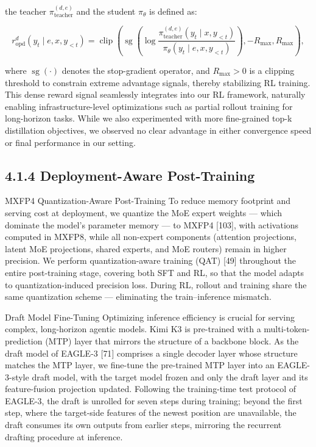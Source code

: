 \documentclass[
  10
]{article}
\begin{document}
the teacher \(\pi _ { \mathrm { t e a c h e r } } ^ { ( d , e ) }\) and
the student \(\pi _ { \theta }\) is defined as:

\[
r _ {\mathrm{opd}} ^ {d} (y _ {t} \mid e, x, y _ {<   t}) = \operatorname{clip} \left(\operatorname{sg} \left(\log \frac {\pi_ {\text {teacher}} ^ {(d , e)} (y _ {t} \mid x , y _ {<   t})}{\pi_ {\theta} (y _ {t} \mid e , x , y _ {<   t})}\right), - R _ {\max}, R _ {\max}\right),\tag{15}
\]

where \(\operatorname { s g } ( \cdot )\) denotes the stop-gradient
operator, and \(R _ { \operatorname* { m a x } } > 0\) is a clipping
threshold to constrain extreme advantage signals, thereby stabilizing RL
training. This dense reward signal seamlessly integrates into our RL
framework, naturally enabling infrastructure-level optimizations such as
partial rollout training for long-horizon tasks. While we also
experimented with more fine-grained top-k distillation objectives, we
observed no clear advantage in either convergence speed or final
performance in our setting.

\subsection{4.1.4 Deployment-Aware
Post-Training}\label{deployment-aware-post-training}

MXFP4 Quantization-Aware Post-Training To reduce memory footprint and
serving cost at deployment, we quantize the MoE expert weights --- which
dominate the model's parameter memory --- to MXFP4 {[}103{]}, with
activations computed in MXFP8, while all non-expert components
(attention projections, latent MoE projections, shared experts, and MoE
routers) remain in higher precision. We perform quantization-aware
training (QAT) {[}49{]} throughout the entire post-training stage,
covering both SFT and RL, so that the model adapts to
quantization-induced precision loss. During RL, rollout and training
share the same quantization scheme --- eliminating the train--inference
mismatch.

Draft Model Fine-Tuning Optimizing inference efficiency is crucial for
serving complex, long-horizon agentic models. Kimi K3 is pre-trained
with a multi-token-prediction (MTP) layer that mirrors the structure of
a backbone block. As the draft model of EAGLE-3 {[}71{]} comprises a
single decoder layer whose structure matches the MTP layer, we fine-tune
the pre-trained MTP layer into an EAGLE-3-style draft model, with the
target model frozen and only the draft layer and its feature-fusion
projection updated. Following the training-time test protocol of
EAGLE-3, the draft is unrolled for seven steps during training; beyond
the first step, where the target-side features of the newest position
are unavailable, the draft consumes its own outputs from earlier steps,
mirroring the recurrent drafting procedure at inference.
\end{document}
